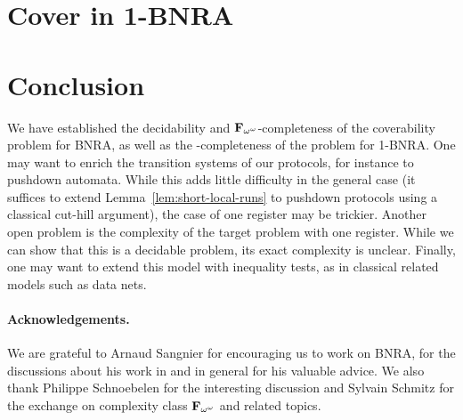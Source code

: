 \documentclass[runningheads]{llncs}
\begin{document}
	
%
	
	
	
	\section{Cover in 1-BNRA}
	\label{sec:cover-1BNRA}
	
	
%	
%
	\section{Conclusion}
	We have established the decidability and $\mathbf{F}_{\omega^\omega}$-completeness of the coverability problem for BNRA, as well as the \NP-completeness of the problem for 1-BNRA.
	One may want to enrich the transition systems of our protocols, for instance to pushdown automata. While this adds little difficulty in the general case (it suffices to extend Lemma~\ref{lem:short-local-runs} to pushdown protocols using a classical cut-hill argument), the case of one register may be trickier.
	Another open problem is the complexity of the target problem with one register. While we can show that this is a decidable problem, its exact complexity is unclear. 
	Finally, one may want to extend this model with inequality tests, as in classical related models such as data nets.
	
	\paragraph*{Acknowledgements.} We are grateful to Arnaud Sangnier for encouraging us to work on BNRA, for the discussions about his work in \cite{DelzannoST13} and in general for his valuable advice. We also thank Philippe Schnoebelen for the interesting discussion and Sylvain Schmitz for the exchange on complexity class $\mathbf{F}_{\omega^{\omega}}$ and related topics.   
	
	
	\newpage
	
	\appendix
%	
	 
	
	

	
	
	
	
	
	
\end{document}
